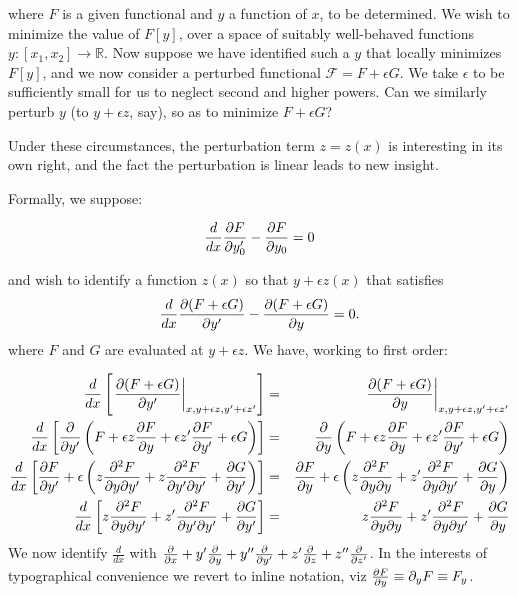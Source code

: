 \documentclass[pdflatex,sn-mathphys-num]{sn-jnl}%
\theoremstyle{thmstyleone}%
\theoremstyle{thmstyletwo}%
\theoremstyle{thmstylethree}%
\begin{document}
\noindent where $F$ is a given functional and $y$ a function of $x$,
to be determined.  We wish to minimize the value of $F[y]$, over a
space of suitably well-behaved functions
$y\colon\left[x_1,x_2\right]\longrightarrow\mathbb{R}$.  Now suppose
we have identified such a $y$ that locally minimizes $F[y]$, and we
now consider a perturbed functional $\mathcal{F}=F+\epsilon G$.  We
take $\epsilon$ to be sufficiently small for us to neglect second and
higher powers.  Can we similarly perturb $y$ (to $y+\epsilon z$, say),
so as to minimize $F+\epsilon G$?

Under these circumstances, the perturbation term $z=z(x)$ is
interesting in its own right, and the fact the perturbation is linear
leads to new insight.

Formally, we suppose:

\begin{equation}
  \frac{d}{dx}\frac{\partial{F}}{\partial{y_0'}}-\frac{\partial{F}}{\partial{y_0}} = 0 
\end{equation}

and wish to identify a function $z(x)$ so that $y+\epsilon z(x)$ that
satisfies
\begin{equation}
  \frac{d}{dx}\frac{\partial{(F+\epsilon G)}}{\partial{y'}}-\frac{\partial{(F+\epsilon G)}}{\partial{y}} = 0.
\end{equation}
%
where $F$ and $G$ are evaluated at $y+\epsilon z$.  We have, working
to first order:

\begin{eqnarray}
\frac{d}{dx}\left[\left.\frac{\partial{(F+\epsilon G)}}{\partial{y'}}\right|_{x,y+\epsilon z,y'+\epsilon z'}\right]
&=& \left.\frac{\partial{(F+\epsilon G)}}{\partial{y}}\right|_{x,y+\epsilon z,y'+\epsilon z'}\nonumber\\
\frac{d}{dx}\left[\frac{\partial{}}{\partial{y'}}\left(F + \epsilon z\frac{\partial{F}}{\partial{y}} + \epsilon z'\frac{\partial{F}}{\partial{y'}}+\epsilon G\right)\right]
&=& \frac{\partial{}}{\partial{y}}\left(F + \epsilon z\frac{\partial{F}}{\partial{y}} + \epsilon z'\frac{\partial{F}}{\partial{y'}}+\epsilon G\right)\nonumber\\
\frac{d}{dx}\left[\frac{\partial{F}}{\partial{y'}} + \epsilon\left(z\frac{\partial^2{F}}{\partial{y}\partial{y'}} + z\frac{\partial^2{F}}{\partial{y'}\partial{y'}} + \frac{\partial{G}}{\partial{y'}}\right)\right]
&=& \frac{\partial{F}}{\partial{y}} + \epsilon\left(z\frac{\partial^2{F}}{\partial{y}\partial{y}} + z'\frac{\partial^2{F}}{\partial{y}\partial{y'}} + \frac{\partial{G}}{\partial{y}}\right)\nonumber\\
\frac{d}{dx}\left[z\frac{\partial^2{F}}{\partial{y}\partial{y'}} + z'\frac{\partial^2{F}}{\partial{y'}\partial{y'}} + \frac{\partial{G}}{\partial{y'}}\right]
&=& z\frac{\partial^2{F}}{\partial{y}\partial{y}} + z'\frac{\partial^2{F}}{\partial{y}\partial{y'}} + \frac{\partial{G}}{\partial{y}}
\end{eqnarray}
%
We now identify $\frac{d}{dx}$ with $\frac{\partial{}}{\partial{x}} + y'\frac{\partial{}}{\partial{y}} +
y''\frac{\partial{}}{\partial{y'}} + z'\frac{\partial{}}{\partial{z}} + z''\frac{\partial{}}{\partial{z'}}$.  In the interests of
typographical convenience we revert to inline notation, viz
$\frac{\partial{F}}{\partial{y}}\equiv\partial_yF\equiv F_y$.
\end{document}
